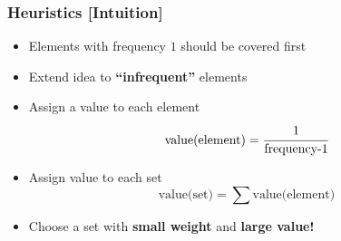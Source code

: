 \documentclass{beamer}
\begin{document}
\begin{frame}
\frametitle{Heuristics [Intuition]}
\begin{minipage}{0.30\textwidth}
\begin{overlayarea}{\textwidth}{0.5\textheight}
% 
% 
\end{overlayarea}%
\end{minipage}%
\begin{minipage}{0.70\textwidth} 
\begin{itemize}
\item<1-> Elements with frequency $1$ should be covered first
\item<2-> Extend idea to \textbf{``infrequent''} elements
\item<3-> Assign a value to each element
  	$$ \text{value(element)} = \cfrac{1}{\text{frequency-1}}$$
\item<4-> Assign value to each set
	$$ \text{value(set)} = \sum \text{value(element)}$$
\item<5> Choose a set with \textbf{small weight} and \textbf{large value!}
\end{itemize}
\end{minipage}
\end{frame}
\end{document}
